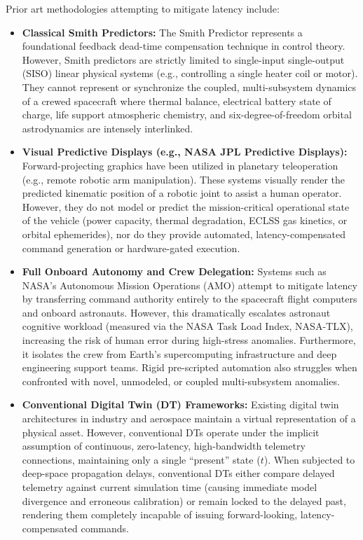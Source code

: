 \documentclass[12pt,a4paper]{article}
\begin{document}
Prior art methodologies attempting to mitigate latency include:
\begin{itemize}
    \item \textbf{Classical Smith Predictors:} The Smith Predictor represents a foundational feedback dead-time compensation technique in control theory. However, Smith predictors are strictly limited to single-input single-output (SISO) linear physical systems (e.g., controlling a single heater coil or motor). They cannot represent or synchronize the coupled, multi-subsystem dynamics of a crewed spacecraft where thermal balance, electrical battery state of charge, life support atmospheric chemistry, and six-degree-of-freedom orbital astrodynamics are intensely interlinked.
    \item \textbf{Visual Predictive Displays (e.g., NASA JPL Predictive Displays):} Forward-projecting graphics have been utilized in planetary teleoperation (e.g., remote robotic arm manipulation). These systems visually render the predicted kinematic position of a robotic joint to assist a human operator. However, they do not model or predict the mission-critical operational state of the vehicle (power capacity, thermal degradation, ECLSS gas kinetics, or orbital ephemerides), nor do they provide automated, latency-compensated command generation or hardware-gated execution.
    \item \textbf{Full Onboard Autonomy and Crew Delegation:} Systems such as NASA's Autonomous Mission Operations (AMO) attempt to mitigate latency by transferring command authority entirely to the spacecraft flight computers and onboard astronauts. However, this dramatically escalates astronaut cognitive workload (measured via the NASA Task Load Index, NASA-TLX), increasing the risk of human error during high-stress anomalies. Furthermore, it isolates the crew from Earth's supercomputing infrastructure and deep engineering support teams. Rigid pre-scripted automation also struggles when confronted with novel, unmodeled, or coupled multi-subsystem anomalies.
    \item \textbf{Conventional Digital Twin (DT) Frameworks:} Existing digital twin architectures in industry and aerospace maintain a virtual representation of a physical asset. However, conventional DTs operate under the implicit assumption of continuous, zero-latency, high-bandwidth telemetry connections, maintaining only a single ``present'' state ($t$). When subjected to deep-space propagation delays, conventional DTs either compare delayed telemetry against current simulation time (causing immediate model divergence and erroneous calibration) or remain locked to the delayed past, rendering them completely incapable of issuing forward-looking, latency-compensated commands.

\end{itemize}
\end{document}
